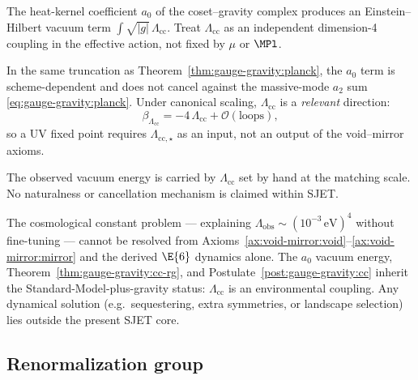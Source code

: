 \begin{definition}
\label{def:gauge-gravity:cc}
The heat-kernel coefficient $a_0$ of the coset--gravity complex produces an
Einstein--Hilbert vacuum term $\int\sqrt{|g|}\,\Lambda_{\mathrm{cc}}$.
Treat $\Lambda_{\mathrm{cc}}$ as an independent dimension-4 coupling in the
effective action, not fixed by $\mu$ or $\MPl$.
\end{definition}

\begin{theorem}
\label{thm:gauge-gravity:cc-rg}
In the same truncation as Theorem~\ref{thm:gauge-gravity:planck}, the
$a_0$ term is scheme-dependent and does not cancel against the massive-mode
$a_2$ sum \eqref{eq:gauge-gravity:planck}. Under canonical scaling,
$\Lambda_{\mathrm{cc}}$ is a \emph{relevant} direction:
\begin{equation}\label{eq:gauge-gravity:beta-Lambda}
  \beta_{\Lambda_{\mathrm{cc}}}
  =-4\,\Lambda_{\mathrm{cc}}+\mathcal{O}(\text{loops}),
\end{equation}
so a UV fixed point requires $\Lambda_{\mathrm{cc},\star}$ as an input, not
an output of the void--mirror axioms.
\end{theorem}

\begin{postulate}
\label{post:gauge-gravity:cc}
The observed vacuum energy is carried by $\Lambda_{\mathrm{cc}}$ set by hand
at the matching scale. No naturalness or cancellation mechanism is claimed
within SJET.
\end{postulate}

\begin{proposition}
\label{prop:gauge-gravity:cc-nogo}
The cosmological constant problem --- explaining
$\Lambda_{\mathrm{obs}}\sim(10^{-3}\,\mathrm{eV})^4$ without fine-tuning ---
cannot be resolved from Axioms~\ref{ax:void-mirror:void}--\ref{ax:void-mirror:mirror}
and the derived $\E{6}$ dynamics alone. The $a_0$ vacuum energy,
Theorem~\ref{thm:gauge-gravity:cc-rg}, and
Postulate~\ref{post:gauge-gravity:cc} inherit the Standard-Model-plus-gravity
status: $\Lambda_{\mathrm{cc}}$ is an environmental coupling. Any dynamical
solution (e.g.\ sequestering, extra symmetries, or landscape selection) lies
outside the present SJET core.
\end{proposition}

\subsection{Renormalization group}
\label{sec:gauge-gravity:rg}


